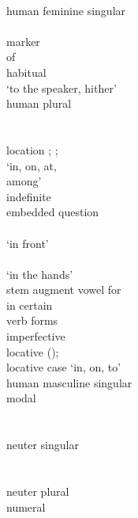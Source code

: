 \begin{multicols}{2}
\begin{tabbing}
				\>	\\
				\>	human feminine singular\\
				\>	\\
				\>  marker\\
				\>  of \\
				\>	habitual\\
				\>	 `to the speaker, hither'\\
				\>	human plural\\
				\>	\\
				\>	\\
				\>	location \sqt{in};  ;\\
			{}		\>	     `in, on, at, \\ \> among' \\
				\>	indefinite\\
				\>	embedded question\\
				\>	\\
				\>	 `in front'\\
				\>	\\
						\>  `in the hands'\\
				\>	stem augment vowel for \\ \>  in certain \\ \> verb forms\\
				\>	imperfective\\
				\>	locative ();\\
			{}		\>	locative case `in, on, to'\\
					\>	human masculine singular\\
				\>	modal\\
				\>	\\
				\>	\\
					\>	neuter singular\\
				\>	\\
				\>	\\
				\>	neuter plural\\
				\>	numeral\\

\end{tabbing}
\end{multicols}
